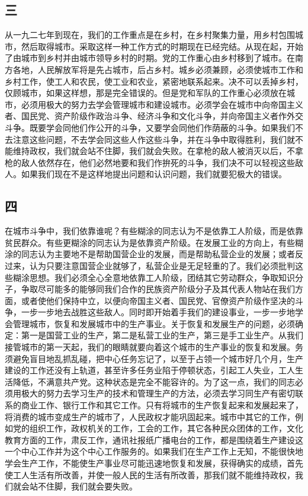 \documentclass[cn,11pt,chinese]{elegantbook}
\def\myformat#1{\hfil\hfil #1}
\begin{document}
\subsection*{\myformat{三 }}
从一九二七年到现在，我们的工作重点是在乡村，在乡村聚集力量，用乡村包围城市，然后取得城市。采取这样一种工作方式的时期现在已经完结。从现在起，开始了由城市到乡村并由城市领导乡村的时期。党的工作重心由乡村移到了城市。在南方各地，人民解放军将是先占城市，后占乡村。城乡必须兼顾，必须使城市工作和乡村工作，使工人和农民，使工业和农业，紧密地联系起来。决不可以丢掉乡村，仅顾城市，如果这样想，那是完全错误的。但是党和军队的工作重心必须放在城市，必须用极大的努力去学会管理城市和建设城市。必须学会在城市中向帝国主义者、国民党、资产阶级作政治斗争、经济斗争和文化斗争，并向帝国主义者作外交斗争。既要学会同他们作公开的斗争，又要学会同他们作荫蔽的斗争。如果我们不去注意这些问题，不去学会同这些人作这些斗争，并在斗争中取得胜利，我们就不能维持政权，我们就会站不住脚，我们就会失败。在拿枪的敌人被消灭以后，不拿枪的敌人依然存在，他们必然地要和我们作拚死的斗争，我们决不可以轻视这些敌人。如果我们现在不是这样地提出问题和认识问题，我们就要犯极大的错误。\\
\subsection*{\myformat{四 }}
在城市斗争中，我们依靠谁呢？有些糊涂的同志认为不是依靠工人阶级，而是依靠贫民群众。有些更糊涂的同志认为是依靠资产阶级。在发展工业的方向上，有些糊涂的同志认为主要地不是帮助国营企业的发展，而是帮助私营企业的发展；或者反过来，认为只要注意国营企业就够了，私营企业是无足轻重的了。我们必须批判这些糊涂思想。我们必须全心全意地依靠工人阶级，团结其它劳动群众，争取知识分子，争取尽可能多的能够同我们合作的民族资产阶级分子及其代表人物站在我们方面，或者使他们保持中立，以便向帝国主义者、国民党、官僚资产阶级作坚决的斗争，一步一步地去战胜这些敌人。同时即开始着手我们的建设事业，一步一步地学会管理城市，恢复和发展城市中的生产事业。关于恢复和发展生产的问题，必须确定：第一是国营工业的生产，第二是私营工业的生产，第三是手工业生产。从我们接管城市的第一天起，我们的眼睛就要向着这个城市的生产事业的恢复和发展。务须避免盲目地乱抓乱碰，把中心任务忘记了，以至于占领一个城市好几个月，生产建设的工作还没有上轨道，甚至许多任务业陷于停顿状态，引起工人失业，工人生活降低，不满意共产党。这种状态是完全不能容许的。为了这一点，我们的同志必须用极大的努力去学习生产的技术和管理生产的方法，必须去学习同生产有密切联系的商业工作、银行工作和其它工作。只有将城市的生产恢复起来和发展起来了，将消费的城市变成生产的城市了，人民政权才能巩固起来。城市中其它的工作，例如党的组织工作，政权机关的工作，工会的工作，其它各种民众团体的工作，文化教育方面的工作，肃反工作，通讯社报纸广播电台的工作，都是围绕着生产建设这一个中心工作并为这个中心工作服务的。如果我们在生产工作上无知，不能很快地学会生产工作，不能使生产事业尽可能迅速地恢复和发展，获得确实的成绩，首先使工人生活有所改善，并使一般人民的生活有所改善，那我们就不能维持政权，我们就会站不住脚，我们就会要失败。\\
\end{document}
